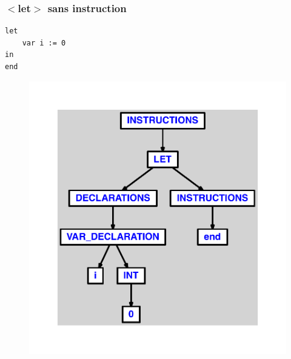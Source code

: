 \documentclass{article}
\begin{document}
\subsubsection{$ < $let$ > $ sans instruction}
\begin{lstlisting}
let
	var i := 0
in
end
\end{lstlisting}
\newpage
\begin{figure}[H]
\centering
\includegraphics[max width=\textwidth]{ast/ast_268.pdf}
\end{figure}
\newpage
\end{document}
